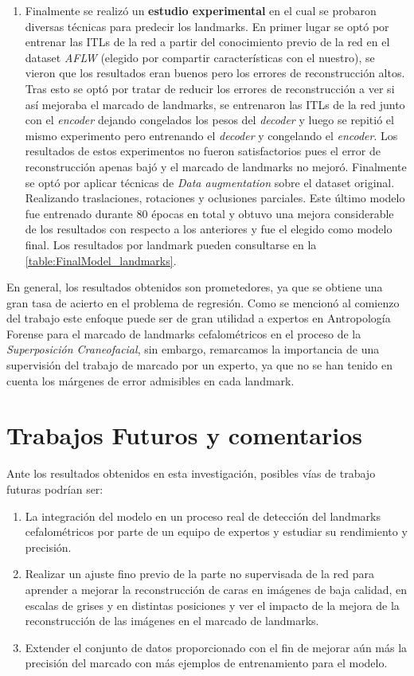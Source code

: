 \begin{enumerate}
    \item Finalmente se realizó un \textbf{estudio experimental} en el cual se probaron diversas técnicas para predecir los landmarks. En primer lugar se optó por entrenar las ITLs de la red a partir del conocimiento previo de la red en el dataset \textit{AFLW} (elegido por compartir características con el nuestro), se vieron que los resultados eran buenos pero los errores de reconstrucción altos. Tras esto se optó por tratar de reducir los errores de reconstrucción a ver si así mejoraba el marcado de landmarks, se entrenaron las ITLs de la red junto con el \textit{encoder} dejando congelados los pesos del \textit{decoder} y luego se repitió el mismo experimento pero entrenando el \textit{decoder} y congelando el \textit{encoder}. Los resultados de estos experimentos no fueron satisfactorios pues el error de reconstrucción apenas bajó y el marcado de landmarks no mejoró. Finalmente se optó por aplicar técnicas de \textit{Data augmentation} sobre el dataset original. Realizando traslaciones, rotaciones y oclusiones parciales. Este último modelo fue entrenado durante $80$ épocas en total y obtuvo una mejora considerable de los resultados con respecto a los anteriores y fue el elegido como modelo final. Los resultados por landmark pueden consultarse en la \autoref{table:FinalModel_landmarks}.
\end{enumerate}

\medskip

\noindent En general, los resultados obtenidos son prometedores, ya que se obtiene una gran tasa de acierto en el problema de regresión. Como se mencionó al comienzo del trabajo este enfoque puede ser de gran utilidad a expertos en Antropología Forense para el marcado de landmarks cefalométricos en el proceso de la \textit{Superposición Craneofacial}, sin embargo, remarcamos la importancia de una supervisión del trabajo de marcado por un experto, ya que no se han tenido en cuenta los márgenes de error admisibles en cada landmark.

\section{Trabajos Futuros y comentarios}

\noindent Ante los resultados obtenidos en esta investigación, posibles vías de trabajo futuras podrían ser:

\begin{enumerate}
    \item La integración del modelo en un proceso real de detección del landmarks cefalométricos por parte de un equipo de expertos y estudiar su rendimiento y precisión.
    \item Realizar un ajuste fino previo de la parte no supervisada de la red para aprender a mejorar la reconstrucción de caras en imágenes de baja calidad, en escalas de grises y en distintas posiciones y ver el impacto de la mejora de la reconstrucción de las imágenes en el marcado de landmarks.
    \item Extender el conjunto de datos proporcionado con el fin de mejorar aún más la precisión del marcado con más ejemplos de entrenamiento para el modelo.
\end{enumerate}

